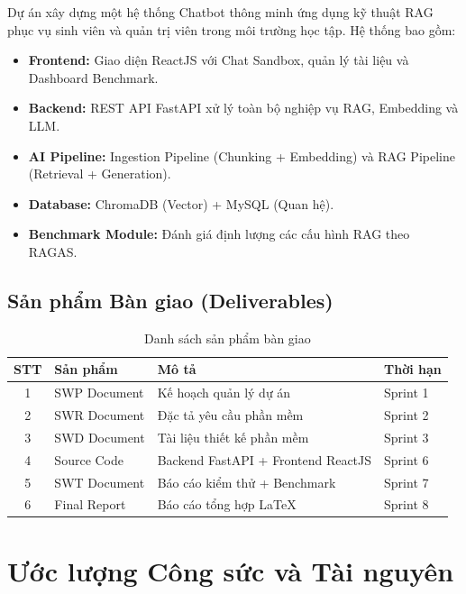 Dự án xây dựng một hệ thống Chatbot thông minh ứng dụng kỹ thuật RAG phục vụ sinh viên và quản trị viên trong môi trường học tập. Hệ thống bao gồm:
\begin{itemize}[itemsep=3pt]
  \item \textbf{Frontend:} Giao diện ReactJS với Chat Sandbox, quản lý tài liệu và Dashboard Benchmark.
  \item \textbf{Backend:} REST API FastAPI xử lý toàn bộ nghiệp vụ RAG, Embedding và LLM.
  \item \textbf{AI Pipeline:} Ingestion Pipeline (Chunking + Embedding) và RAG Pipeline (Retrieval + Generation).
  \item \textbf{Database:} ChromaDB (Vector) + MySQL (Quan hệ).
  \item \textbf{Benchmark Module:} Đánh giá định lượng các cấu hình RAG theo RAGAS.
\end{itemize}

\subsection{Sản phẩm Bàn giao (Deliverables)}

\begin{table}[H]
  \centering
  \caption{Danh sách sản phẩm bàn giao}
  \label{tab:deliverables}
  \renewcommand{\arraystretch}{1.4}
  \begin{tabularx}{\textwidth}{|c|l|X|l|}
    \hline
    \rowcolor{blue!10}
    \textbf{STT} & \textbf{Sản phẩm} & \textbf{Mô tả} & \textbf{Thời hạn} \\
    \hline
    1 & SWP Document & Kế hoạch quản lý dự án & Sprint 1 \\
    \hline
    2 & SWR Document & Đặc tả yêu cầu phần mềm & Sprint 2 \\
    \hline
    3 & SWD Document & Tài liệu thiết kế phần mềm & Sprint 3 \\
    \hline
    4 & Source Code & Backend FastAPI + Frontend ReactJS & Sprint 6 \\
    \hline
    5 & SWT Document & Báo cáo kiểm thử + Benchmark & Sprint 7 \\
    \hline
    6 & Final Report & Báo cáo tổng hợp LaTeX & Sprint 8 \\
    \hline
  \end{tabularx}
\end{table}

\section{Ước lượng Công sức và Tài nguyên}

